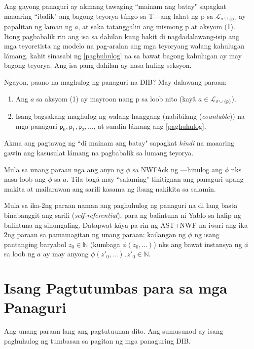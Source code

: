 \documentclass{article}
\begin{document}
Ang gayong panaguri ay akmang tawaging ``mainam ang batay" sapagkat maaaring ``ibalik" ang bagong teyorya túngo sa \textsf{T}---ang lahat ng \textsf{p} sa $\mathcal{L}_{\sigma \cup \{\textsf{p}\}}$ ay papalitan ng laman ng $a$, at saka tatanggalin ang mismong \textsf{p} at aksyom (1). Itong pagbabalik rin ang isa sa dahilan kung bakit di nagdadalawang-isip ang mga teyoretista ng modelo na pag-aralan ang mga teyoryang walang kahulugan lámang, kahit sinasabi ng \ref{paghuhulog} na sa bawat bagong kahulugan ay may bagong teyorya. Ang isa pang dahilan ay nasa huling seksyon.

Ngayon, paano na maghulog ng panaguri na DIB? May dalawang paraan:

\begin{enumerate}
\item Ang $a$ sa aksyom (1) ay mayroon nang \textsf{p} sa loob nito (kayâ $a \in \mathcal{L}_{\sigma \cup \{\textsf{p}\}}$).
\item Isang bagsakang maghulog ng walang hanggang (nabibilang (\textit{countable})) na mga panaguri $\textsf{p}_{0}, \textsf{p}_{1}, \textsf{p}_{2}, \ldots$, at sundin lámang ang \ref{paghuhulog}.
\end{enumerate}

\noindent Akma ang pagtawag ng ``di mainam ang batay" sapagkat \textit{hindi} na maaaring gawin ang kasusulat lámang na pagbabalik sa lumang teyorya.

Mula sa unang paraan nga ang anyo ng $\phi$ sa \textsf{NWFAck} ng \cite{ast-nwf}---hinulog ang $\phi$ nks nasa loob ang $\phi$ sa $a$. Tila bagá may ``salaming" tinitignan ang panaguri upang makita at mailarawan ang sarili kasama ng ibang nakikita sa salamin.

Mula sa ika-2ng paraan naman ang paghuhulog ng panaguri na di lang basta binabanggit ang sarili (\textit{self-referential}), para ng balintuna ni Yablo\cite{yablo} sa halip ng balintuna ng sinungaling. Datapwat káya pa rin ng \textsf{AST+NWF} na iwari ang ika-2ng paraan sa pamamagitan ng unang paraan: kailangan ng $\phi$ ng isang pantanging baryabol $z_0\in\mathbb{N}$ (kumbaga $\phi(z_0, \ldots)$) nks ang bawat instansya ng $\phi$ sa loob ng $a$ ay may anyong $\phi(z'_0, \ldots), z'_0 \in\mathbb{N}$.

\section{Isang Pagtutumbas para sa mga Panaguri}

Ang unang paraan lang ang pagtutuunan dito. Ang sumusunod ay isang paghuhulog ng tumbasan sa pagitan ng mga panaguring DIB.
\end{document}
